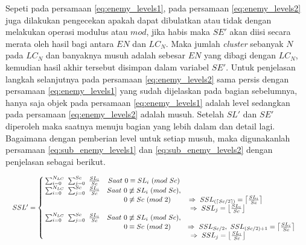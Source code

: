 Sepeti pada persamaan \ref{eq:enemy_levels1}, pada persamaan \ref{eq:enemy_levels2} juga dilakukan pengecekan apakah dapat dibulatkan atau tidak dengan melakukan operasi modulus atau $mod$, jika habis maka $SE'$ akan diisi secara merata oleh hasil bagi antara $EN$ dan $LC_{N}$. Maka jumlah \textit{cluster} sebanyak $N$ pada $LC_{N}$ dan banyaknya musuh adalah sebesar $EN$ yang dibagi dengan $LC_{N}$, kemudian hasil akhir tersebut disimpan dalam variabel $SE'$. Untuk penjelasan langkah selanjutnya pada persamaan \ref{eq:enemy_levels2} sama persis dengan persamaan \ref{eq:enemy_levels1} yang sudah dijelaskan pada bagian sebelumnya, hanya saja objek pada persamaan \ref{eq:enemy_levels1} adalah level sedangkan pada persamaan \ref{eq:enemy_levels2} adalah musuh. Setelah $SL'$ dan $SE'$ diperoleh maka saatnya menuju bagian yang lebih dalam dan detail lagi. Bagaimana dengan pemberian level untuk setiap musuh, maka digunakanlah persamaan \ref{eq:sub_enemy_levels1} dan \ref{eq:sub_enemy_levels2} dengan penjelasan sebagai berikut.
\vspace{1ex}

\begin{equation}\label{eq:sub_enemy_levels1}
\resizebox{\columnwidth}{!}{%
	$SSL' = \left\{\begin{matrix}
	\hspace{0.2em} \sum_{i = 0}^{N_{LC}}\ \sum_{j = 0}^{Sc}\ \frac{SL_{i}}{Sc} & Saat\ 0 \equiv SL_{i}\ (mod\ Sc) & \\
	
	\hspace{0.2em} \sum_{i = 0}^{N_{LC}}\ \sum_{j = 0}^{Sc}\ \frac{SL_{i}}{Sc} & Saat\ 0 \not\equiv SL_{i}\ (mod\ Sc), & \\
	&\hspace{1.0em}  0 \not\equiv Sc\ (mod\ 2) & \hspace{-4.5em} \Rightarrow\ SSL_{(\left \lceil Sc/2 \right \rceil)}  = \left \lceil \frac{SL_{i}}{Sc} \right \rceil &\\
	
	& & \hspace{-6.8em} \Rightarrow\ SSL_{j}  = \left \lfloor \frac{SL_{i}}{Sc} \right \rfloor &\\
	
	\hspace{0.2em} \sum_{i = 0}^{N_{LC}}\ \sum_{j = 0}^{Sc}\ \frac{SL_{i}}{Sc} & Saat\ 0 \not\equiv SL_{i}\ (mod\ Sc), & \\
	&\hspace{1.0em}  0 \equiv Sc\ (mod\ 2) & \Rightarrow\ SSL_{Sc/2},\ SSL_{(Sc/2) + 1}  = \left \lceil \frac{SL_{i}}{Sc} \right \rceil &\\
	
	& & \hspace{-6.7em} \Rightarrow\ SSL_{j}  = \left \lfloor \frac{SL_{i}}{Sc} \right \rfloor &\\
	\end{matrix}\right.$%
}
\end{equation}

